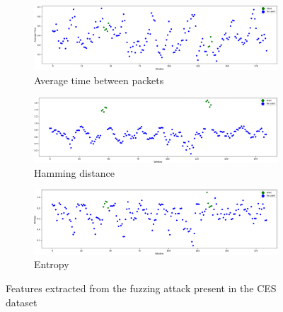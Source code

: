 \begin{figure}
    \centering
    \begin{subfigure}[b]{.6\linewidth}
        \includegraphics[width = \linewidth]{img/parts/app/tests/ces/fuzzy/AvgTime.png}
        \caption{Average time between packets}
        \label{subfig:ces_fuzzy_avgtime}
    \end{subfigure}
    \begin{subfigure}[b]{.6\linewidth}
        \includegraphics[width = \linewidth]{img/parts/app/tests/ces/fuzzy/HammingDist.png}
        \caption{Hamming distance}
        \label{subfig:ces_fuzzy_hammingdist}
    \end{subfigure}
    \begin{subfigure}[b]{.6\linewidth}
        \includegraphics[width = \linewidth]{img/parts/app/tests/ces/fuzzy/Entropy.png}
        \caption{Entropy}
        \label{subfig:ces_fuzzy_entropy}
    \end{subfigure}
    \caption{Features extracted from the fuzzing attack present in the CES dataset}
    \label{fig:ces_fuzzy}
\end{figure}

